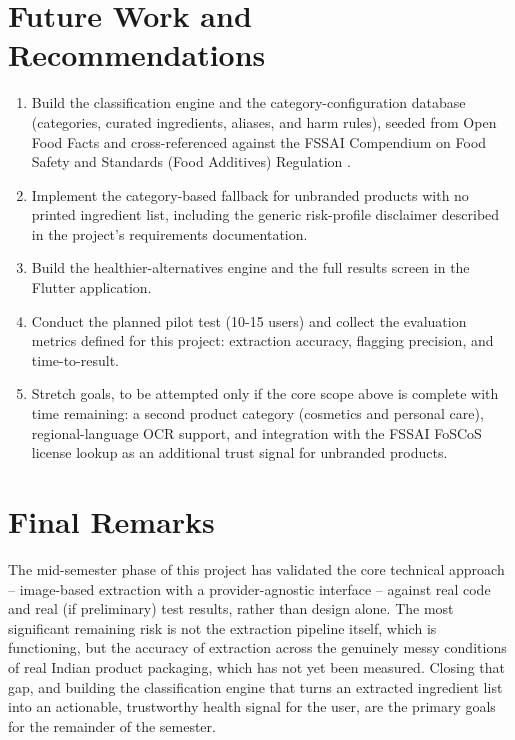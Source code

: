 \documentclass{report}
\begin{document}
\section{Future Work and Recommendations}

\begin{enumerate}
  \item Build the classification engine and the category-configuration
    database (categories, curated ingredients, aliases, and harm rules),
    seeded from Open Food Facts \cite{openfoodfacts} and cross-referenced
    against the FSSAI Compendium on Food Safety and Standards (Food
    Additives) Regulation \cite{fssaicompendium}.
  \item Implement the category-based fallback for unbranded products
    with no printed ingredient list, including the generic risk-profile
    disclaimer described in the project's requirements documentation.
  \item Build the healthier-alternatives engine and the full results
    screen in the Flutter application.
  \item Conduct the planned pilot test (10-15 users) and collect the
    evaluation metrics defined for this project: extraction accuracy,
    flagging precision, and time-to-result.
  \item Stretch goals, to be attempted only if the core scope above is
    complete with time remaining: a second product category (cosmetics
    and personal care), regional-language OCR support, and integration
    with the FSSAI FoSCoS license lookup as an additional trust signal
    for unbranded products.
\end{enumerate}

\section{Final Remarks}

The mid-semester phase of this project has validated the core technical
approach -- image-based extraction with a provider-agnostic interface --
against real code and real (if preliminary) test results, rather than
design alone. The most significant remaining risk is not the extraction
pipeline itself, which is functioning, but the accuracy of extraction
across the genuinely messy conditions of real Indian product packaging,
which has not yet been measured. Closing that gap, and building the
classification engine that turns an extracted ingredient list into an
actionable, trustworthy health signal for the user, are the primary
goals for the remainder of the semester.
\end{document}
